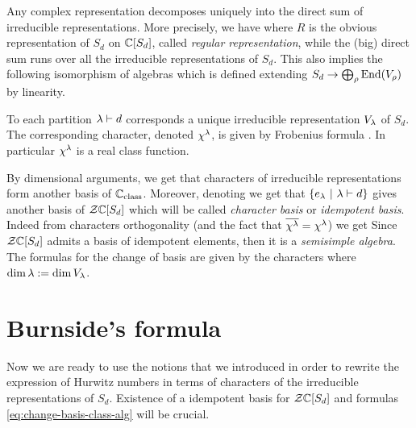 \documentclass[../main/main.tex]{subfiles}
\begin{document}
Any complex representation decomposes uniquely into the direct sum of irreducible representations. More precisely, we have
where $R$ is the obvious representation of $S_d$ on $\mathbb C[S_d]$, called \emph{regular representation}, while the (big) direct sum runs over all the irreducible representations of $S_d$. This also implies the following isomorphism of algebras
which is defined extending $S_d\to\bigoplus_\rho\operatorname{End}(V_\rho)$ by linearity.

\begin{theorem}[{\cite[Thm. 4.3]{FH}}]
	To each partition $\lambda\vdash d$ corresponds a unique irreducible representation $V_\lambda$ of $S_d$. The corresponding character, denoted $\chi^\lambda$, is given by Frobenius formula \cite[Eq. 4.10]{FH}. In particular $\chi^\lambda$ is a real class function.
\end{theorem}

By dimensional arguments, we get that characters of irreducible representations form another basis of $\mathbb C_{\text{class}}$. Moreover, denoting
we get that $\{e_\lambda\ |\ \lambda\vdash d\}$ gives another basis of $\mathcal Z\mathbb C[S_d]$
which will be called \emph{character basis} or \emph{idempotent basis}. Indeed from characters orthogonality (and the fact that $\overline{\chi^\lambda}=\chi^\lambda$) we get
Since $\mathcal Z\mathbb C[S_d]$ admits a basis of idempotent elements, then it is a \emph{semisimple algebra}. The formulas for the change of basis are given by the characters
where $\dim \lambda:=\dim V_\lambda$. 

\section{Burnside's formula}

Now we are ready to use the notions that we introduced in order to rewrite the expression of Hurwitz numbers in terms of characters of the irreducible representations of $S_d$. Existence of a idempotent basis for $\mathcal Z\mathbb C[S_d]$ and formulas \eqref{eq:change-basis-class-alg} will be crucial. 
\end{document}
